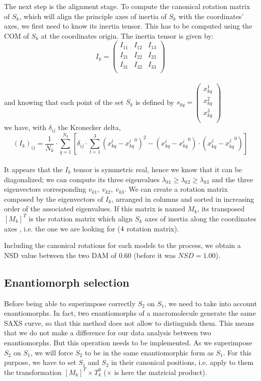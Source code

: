 \documentclass[a4paper, 11pt]{report}
\begin{document}
The next step is the alignment stage. 
To compute the canonical rotation matrix of $S_{k}$, which will align 
the principle axes of inertia of $S_{k}$ with the coordinates' axes, 
we first need to know its inertia tensor. 
This has to be computed using the COM of $S_{k}$ at the coordinates 
origin. 
The inertia tensor is given by:
\[
I_{k}=
\begin{pmatrix}
 I_{11} & I_{12} & I_{13} \\
 I_{21} & I_{22} & I_{23} \\
 I_{31} & I_{32} & I_{33} \\
\end{pmatrix}
\]\\
and knowing that each point of the set $S_{k}$ is defined by
$
s_{kq}=
\begin{pmatrix}
 x_{kq}^1 \\
 x_{kq}^2 \\
 x_{kq}^3 \\
\end{pmatrix}
$\\
we have, with $\delta_{ij}$ the Kronecker delta,
\[
(I_{k})_{ij} = \frac{1}{N_{k}} \cdot \sum\limits_{q=1}^{N_{k}} 
[\delta_{ij} \cdot \sum\limits_{l=1}^3 
 (x_{kq}^l - {x_{kq}^l}^0)^2 -  (x_{kq}^i - {x_{kq}^i}^0) 
 \cdot (x_{kq}^j - {x_{kq}^j}^0)]
\]\\
It appears that the $I_{k}$ tensor is symmetric real, hence we know 
that it can be diagonalized; we can compute its three eigenvalues 
$\lambda_{k1} \geq \lambda_{k2} \geq \lambda_{k3}$ and the three 
eigenvectors corresponding $v_{k1},\ v_{k2},\ v_{k3}$. 
We can create a rotation matrix composed by the eigenvectors of 
$I_{k}$, arranged in columns and sorted in increasing order of the 
associated eigenvalues. 
If this matrix is named $M_{k}$, its transposed $[M_{k}]^T$ is the 
rotation matrix which align $S_{k}$ axes of inertia along the 
coordinates axes \cite{supcomb}, i.e. the one we are looking for 
($4 \time 4$ rotation matrix).

Including the canonical rotations for each models to the process, we 
obtain a NSD value between the two DAM of $0.60$ (before it was 
$NSD = 1.00$).

\subsection{Enantiomorph selection}

Before being able to superimpose correctly $S_{2}$ on $S_{1}$, we need 
to take into account enantiomorphs. 
In fact, two enantiomorphs of a macromolecule generate the same SAXS 
curve, so that this method does not allow to distinguish them. 
This means that we do not make a difference for our data analysis 
between two enantiomorphs.
But this operation needs to be implemented. 
As we superimpose $S_{2}$ on $S_{1}$, we will force $S_{2}$ to be in 
the same enantiomorphic form as $S_{1}$. 
For this purpose, we have to set $S_{1}$ and $S_{2}$ in their canonical 
positions, i.e. apply to them the transformation 
$[M_{k}]^T \times T_{k}^0$ ($\times$ is here the matricial product).
\end{document}
